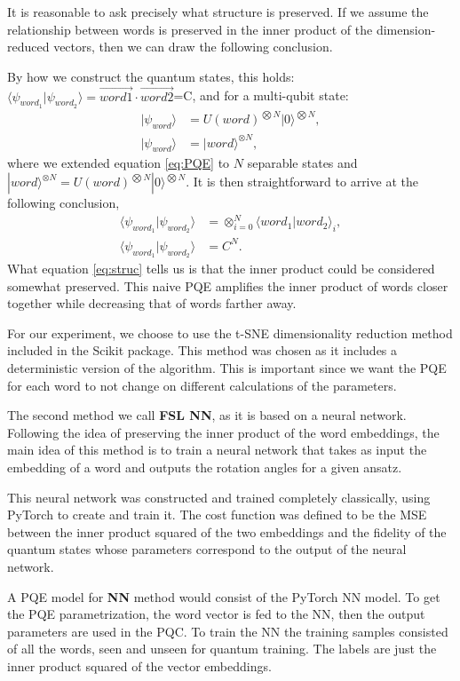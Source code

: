 It is reasonable to ask precisely what structure is preserved. If we assume the relationship between words is preserved in the inner product of the dimension-reduced vectors, then we can draw the following conclusion. 

By how we construct the quantum states, this holds: $\langle \psi_{word_1}|\psi_{word_2}\rangle = \overrightarrow{word1} \cdot \overrightarrow{word2}$=C, and for a multi-qubit state:
\begin{align*}
    |\psi_{word}\rangle &= U(word)^{\bigotimes N}|0\rangle^{\bigotimes N},\\
    |\psi_{word}\rangle &= | word \rangle ^{\otimes N},
\end{align*}
where we extended equation \ref{eq:PQE} to $N$ separable states and $ | word \rangle ^{\otimes N}=U(word)^{\bigotimes N}|0\rangle^{\bigotimes N}$. It is then straightforward to arrive at the following conclusion,
\begin{align}\label{eq:struc}
    \langle \psi_{word_1}|\psi_{word_2} \rangle &=\otimes_{i=0}^N \langle word_1|word_2 \rangle_i, \\
    \langle \psi_{word_1}|\psi_{word_2} \rangle &= C^N.
\end{align}
What equation \ref{eq:struc} tells us is that the inner product could be considered somewhat preserved. This naive PQE amplifies the inner product of words closer together while decreasing that of words farther away.

For our experiment, we choose to use the t-SNE dimensionality reduction method included in the Scikit package. This method was chosen as it includes a deterministic version of the algorithm. This is important since we want the PQE for each word to not change on different calculations of the parameters.

The second method we call \textbf{FSL NN}, as it is based on a neural network. Following the idea of preserving the inner product of the word embeddings, the main idea of this method is to train a neural network that takes as input the embedding of a word and outputs the rotation angles for a given ansatz. 

This neural network was constructed and trained completely classically, using PyTorch to create and train it. The cost function was defined to be the MSE between the inner product squared of the two embeddings and the fidelity of the quantum states whose parameters correspond to the output of the neural network.

A PQE model for \textbf{NN} method would consist of the PyTorch NN model. To get the PQE parametrization, the word vector is fed to the NN, then the output parameters are used in the PQC. To train the NN the training samples consisted of all the words, seen and unseen for quantum training. The labels are just the inner product squared of the vector embeddings.

